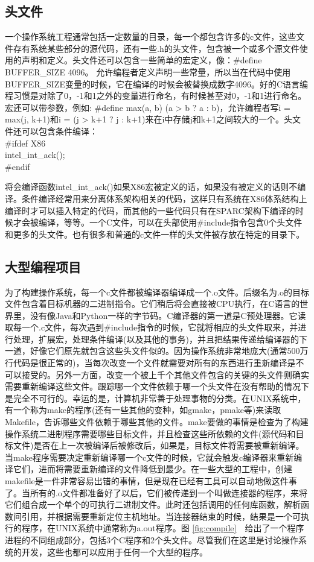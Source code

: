	\subsection{头文件}
	
	一个操作系统工程通常包括一定数量的目录，每一个都包含许多的c文件，这些文件存有系统某些部分的源代码，还有一些.h的头文件，包含被一个或多个源文件使用的声明和定义。头文件还可以包含一些简单的宏定义，像：\#define BUFFER\_SIZE 4096。
	允许编程者定义声明一些常量，所以当在代码中使用BUFFER\_SIZE变量的时候，它在编译的时候会被替换成数字4096。好的C语言编程习惯是对除了0，-1和1之外的变量进行命名，有时候甚至对0，-1和1进行命名。宏还可以带参数，例如: \#define max(a, b) (a > b ? a : b)，允许编程者写i = max(j, k+1)和i = (j > k+1 ? j : k+1)来在i中存储j和k+1之间较大的一个。头文件还可以包含条件编译：
	\\\indent \#ifdef X86 
	\\\indent\indent  intel\_int\_ack(); 
	\\\indent \#endif
	\par 将会编译函数intel\_int\_ack()如果X86宏被定义的话，如果没有被定义的话则不编译。条件编译经常用来分离体系架构相关的代码，这样只有系统在X86体系结构上编译时才可以插入特定的代码，而其他的一些代码只有在SPARC架构下编译的时候才会被编译，等等。一个C文件，可以在头部使用\#include指令包含0个头文件和更多的头文件。也有很多和普通的c文件一样的头文件被存放在特定的目录下。
	
	\subsection{大型编程项目}
	
	为了构建操作系统，每一个c文件都被编译器编译成一个.o文件。后缀名为.o的目标文件包含着目标机器的二进制指令。它们稍后将会直接被CPU执行，在C语言的世界里，没有像Java和Python一样的字节码。C编译器的第一道是C预处理器。它读取每一个.c文件，每次遇到\#include指令的时候，它就将相应的头文件取来，并进行处理，扩展宏，处理条件编译(以及其他的事务)，并且把结果传递给编译器的下一道，好像它们原先就包含这些头文件似的。因为操作系统非常地庞大(通常500万行代码是很正常的)，当每次改变一个文件就需要对所有的东西进行重新编译是不可以接受的。另外一方面，改变一个被上千个其他文件包含的关键的头文件则确实需要重新编译这些文件。跟踪哪一个文件依赖于哪一个头文件在没有帮助的情况下是完全不可行的。幸运的是，计算机非常善于处理事物的分类。在UNIX系统中，有一个称为make的程序(还有一些其他的变种，如gmake，pmake等)来读取Makefile，告诉哪些文件依赖于哪些其他的文件。make要做的事情是检查为了构建操作系统二进制程序需要哪些目标文件，并且检查这些所依赖的文件(源代码和目标文件)是否在上一次被编译后被修改后，如果是，目标文件将需要被重新编译。当make程序需要决定重新编译哪一个c文件的时候，它就会触发c编译器来重新编译它们，进而将需要重新编译的文件降低到最少。在一些大型的工程中，创建makefile是一件非常容易出错的事情，但是现在已经有工具可以自动地做这件事了。当所有的.o文件都准备好了以后，它们被传递到一个叫做连接器的程序，来将它们组合成一个单个的可执行二进制文件。此时还包括调用的任何库函数，解析函数间引用，并根据需要重新定位主机地址。当连接器结束的时候，结果是一个可执行的程序，在UNIX系统中通常称为a.out程序。图 \ref{fig:compile}　给出了一个程序进程的不同组成部分，包括3个C程序和2个头文件。尽管我们在这里是讨论操作系统的开发，这些也都可以应用于任何一个大型的程序。
		
